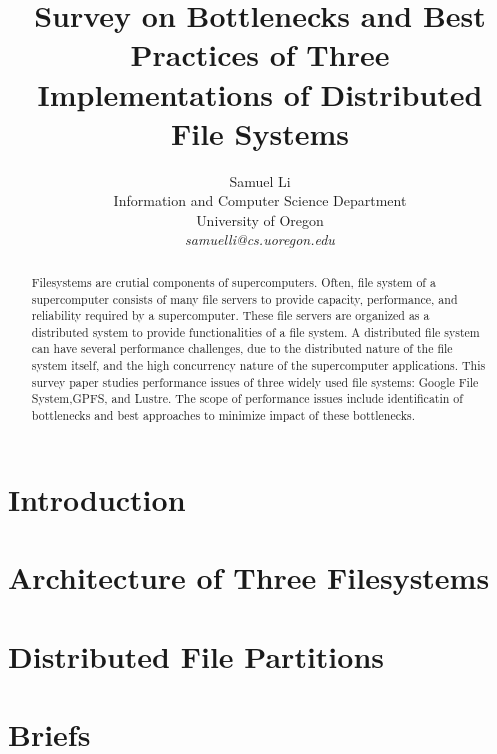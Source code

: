 \documentclass[12pt,twocolumn]{IEEEtran11}
\begin{document}


\title{\Large \bf 
Survey on Bottlenecks and Best Practices of Three Implementations of
Distributed File Systems
}
\author{
Samuel Li\\
Information and Computer Science Department\\
University of Oregon\\
{\em samuelli@cs.uoregon.edu}
}
\maketitle
\begin{abstract}
Filesystems are crutial components of supercomputers.
%
Often, file system of a supercomputer consists of many file servers
to provide capacity, performance, and reliability
required by a supercomputer.
%
These file servers are organized as a distributed system
to provide functionalities of a file system.
%
A distributed file system can have several performance challenges,
due to the distributed nature of the file system itself,
and the high concurrency nature of the supercomputer applications.
%
This survey paper studies performance issues of three widely 
used file systems: Google File System,GPFS, and Lustre.
%
The scope of performance issues include identificatin of bottlenecks
and best approaches to minimize impact of these bottlenecks.
\end{abstract}


\section{Introduction}
\label{sec:intro}


\section{Architecture of Three Filesystems}
\label{sec:architecture}


\section{Distributed File Partitions}
\label{sec:file_partition}



\section{Briefs}
\label{sec:brief}



\end{document}
